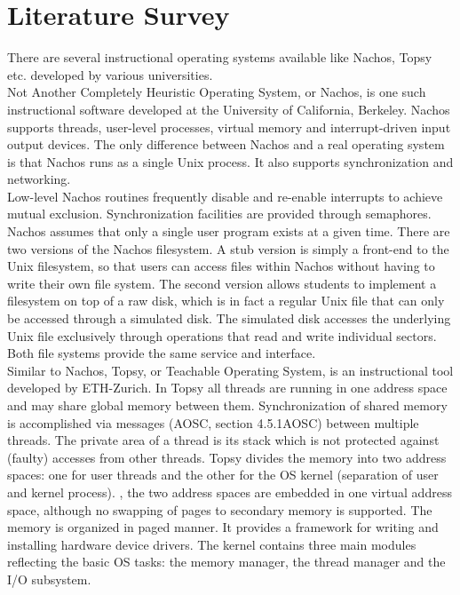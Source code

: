 \chapter{Literature Survey}
\label{chap3}

There are several instructional operating systems available like Nachos, Topsy etc. developed by various universities.\\

Not Another Completely Heuristic Operating System, or Nachos, is one such instructional software developed at the University of California, Berkeley. Nachos supports threads, user-level processes, virtual memory and interrupt-driven input output devices. The only difference between Nachos and a real operating system is that Nachos runs as a single Unix process. It also supports synchronization and networking.\\

Low-level Nachos routines frequently disable and re-enable interrupts to achieve mutual exclusion. Synchronization facilities are provided through semaphores. Nachos assumes that only a single user program exists at a given time. There are two versions of the Nachos filesystem. A stub version is simply a front-end to the Unix filesystem, so that users can access files within Nachos without having to write their own file system. The second version allows students to implement a filesystem on top of a raw disk, which is in fact a regular Unix file that can only be accessed through a simulated disk. The simulated disk accesses the underlying Unix file exclusively through operations that read and write individual sectors. Both file systems provide the same service and interface.\\

Similar to Nachos, Topsy, or Teachable Operating System, is an instructional tool developed by ETH-Zurich. In Topsy all threads are running in one address space and may share global memory between them. Synchronization of shared memory is accomplished via messages (AOSC, section 4.5.1AOSC) between multiple threads. The private area of a thread is its stack which is not protected against (faulty) accesses from other threads. Topsy divides the memory into two address spaces: one for user threads and the other for the OS kernel (separation of user and kernel process). , the two address spaces are embedded in one virtual address space, although no swapping of pages to secondary memory is supported. The memory is organized in paged manner. It provides a framework for writing and installing hardware device drivers. The kernel contains three main modules reflecting the basic OS tasks: the memory manager, the thread manager and the I/O subsystem.\\

